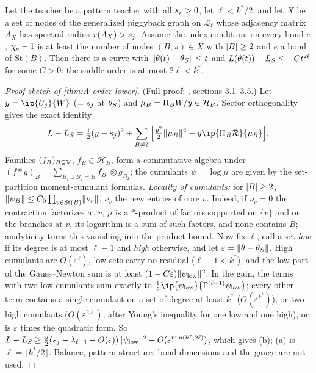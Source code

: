 \begin{theorem}[Sharpness]\label{thm:A-order-sharp}
  \proven{} \newresult{}
  Let the teacher be a pattern teacher with all $s_{r}>0$, let $\ell<k^*/2$, and let $X$ be a set of nodes of
  the generalized piggyback graph on $\mathcal L_\ell$ whose adjacency matrix $A_X$ has spectral radius
  $r(A_X)>s_{j}$. Assume the index condition: on every bond $e$, $\chi_{e}-1$ is at least the number of nodes
  $(B,\pi)\in X$ with $\lvert B\rvert\ge2$ and $e$ a bond of $\mathrm{St}(B)$. Then there is a curve with
  $\lVert\theta(t)-\theta_S\rVert\le t$ and $L(\theta(t))-L_S\le-Ct^{2\ell}$ for some $C>0$: the saddle order
  is at most $2\ell<k^*$.
\end{theorem}
\begin{proof}[Proof sketch of \cref{thm:A-order-lower}]
  (Full proof: , sections 3.1--3.5.) Let $y=\ip{\U j}{\W}$ ($=s_{j}$ at
  $\theta_S$) and $\mu_B=\Pi_BW/y\in\mathcal H_B$. Sector orthogonality gives the exact identity
  \begin{equation}\label{eq:A-sector-identity}
    \Loss-\Loss_S=\tfrac12(y-\tw j)^2+\sum_{B\ne\emptyset}\Big[\tfrac{y^2}2\norm{\mu_B}^2-y\ip{\Pi_B\mathcal R}{\mu_B}\Big].
  \end{equation}
  Families $(f_B)_{B\subseteq\mathcal{V}}$, $f_B\in\mathcal H_B$, form a commutative algebra under
  $(f*g)_B=\sum_{B_1\sqcup B_2=B}f_{B_1}\otimes g_{B_2}$; the cumulants $\psi=\log\mu$ are given by the
  set-partition moment-cumulant formulas. \emph{Locality of cumulants:} for $\lvert B\rvert\ge2$,
  $\lVert\psi_B\rVert\le C_0\prod_{v\in\mathrm{St}(B)}\lVert\nu_v\rVert$, $\nu_v$ the new entries of core $v$. Indeed, if
  $\nu_v=0$ the contraction factorizes at $v$, $\mu$ is a $*$-product of factors supported on $\{v\}$ and on
  the branches at $v$, its logarithm is a sum of such factors, and none contains $B$; analyticity turns
  this vanishing into the product bound. Now fix $\ell$, call a set \emph{low} if its degree is at most
  $\ell-1$ and \emph{high} otherwise, and let $\varepsilon=\lVert\theta-\theta_S\rVert$. High cumulants are
  $O(\varepsilon^{\ell})$, low sets carry no residual ($\ell-1<k^*$), and the low part of the
  Gauss--Newton sum is at least $(1-C\varepsilon)\lVert\psi_{\rm low}\rVert^2$. In the gain, the terms with two
  low cumulants sum exactly to $\tfrac12\ip{\psi_{\rm low}}{\Gamma^{(\ell-1)}\psi_{\rm low}}$; every other
  term contains a single cumulant on a set of degree at least $k^*$ ($O(\varepsilon^{k^*})$), or two high
  cumulants ($O(\varepsilon^{2\ell})$, after Young's inequality for one low and one high), or is
  $\varepsilon$ times the quadratic form. So
  $L-L_S\ge\tfrac{y}2(s_{j}-\lambda_{\ell-1}-O(\varepsilon))\lVert\psi_{\rm low}\rVert^2-O(\varepsilon^{\min(k^*,2\ell)})$,
  which gives (b); (a) is $\ell=\lceil k^*/2\rceil$. Balance, pattern structure, bond dimensions and the
  gauge are not used.
\end{proof}
